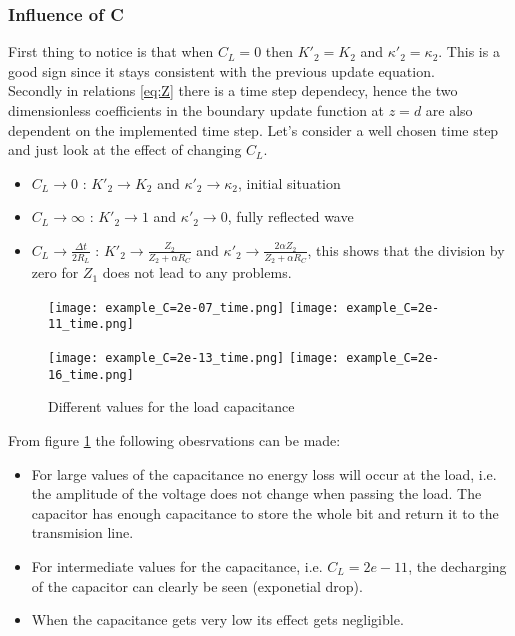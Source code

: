 \subsubsection{Influence of C}

First thing to notice is that when $C_{L} = 0$ then $K'_{2} = K_{2}$ and $\kappa'_{2} = \kappa_{2}$. This is a good
sign since it stays consistent with the previous update equation.\\
Secondly in relations \ref{eq:Z} there is a time step dependecy, hence the two dimensionless
coefficients in the boundary update function at $z=d$ are also dependent on the implemented time step. Let's consider a
well chosen time step and just look at the effect of changing $C_{L}$.
\begin{itemize}
    \item $C_{L} \rightarrow 0$ :
        $K'_{2} \rightarrow K_{2}$ and $\kappa'_{2} \rightarrow \kappa_{2}$, initial situation
    \item $C_{L} \rightarrow \infty$ :
        $ K'_{2} \rightarrow 1$ and $\kappa'_{2} \rightarrow 0$, fully reflected wave
    \item $C_{L} \rightarrow \frac{\Delta t}{2R_{L}}$ :
        $K'_{2} \rightarrow \frac{Z_{2}}{Z_{2}+\alpha R_{C}}$ and $\kappa'_{2} \rightarrow \frac{2\alpha Z_{2}}{Z_{2}+\alpha R_{C}}$, this shows that the division by zero for $Z_1$ does not lead to any problems.
\end{itemize}

\begin{figure}[H]
    \texttt{[image: example\_C=2e-07\_time.png]}
    \texttt{[image: example\_C=2e-11\_time.png]}

    \texttt{[image: example\_C=2e-13\_time.png]}
    \texttt{[image: example\_C=2e-16\_time.png]}
    \caption{Different values for the load capacitance}
    \label{fig:effect_CL}
\end{figure}

From figure \ref*{fig:effect_CL} the following obesrvations can be made:
\begin{itemize}
    \item For large values of the capacitance no energy loss will occur at the load, i.e. the amplitude of the voltage does not change when passing the load. The capacitor has enough capacitance to store the whole bit and return it to the transmision line.
    \item For intermediate values for the capacitance, i.e. $C_L = 2e-11$, the decharging of the capacitor can clearly be seen (exponetial drop).
    \item When the capacitance gets very low its effect gets negligible.
\end{itemize}
